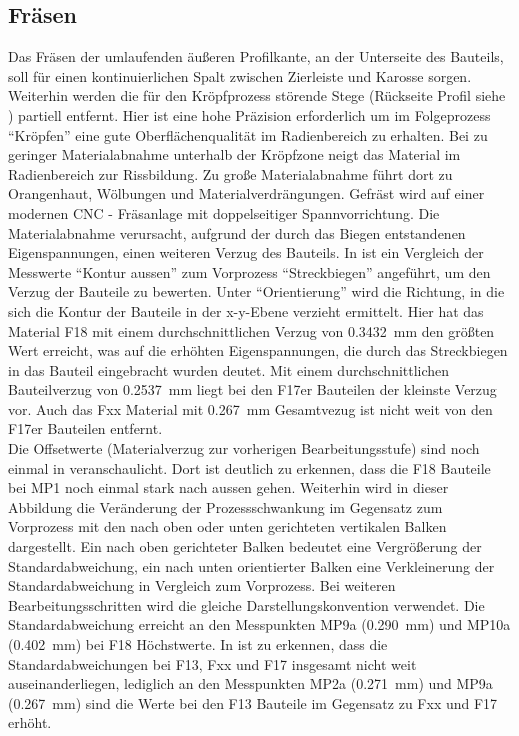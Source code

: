 \documentclass[12pt,a4paper,parskip,twoside,BCOR5mm,headsepline]{scrartcl}
\begin{document}
\subsection{Fräsen}
Das Fräsen der umlaufenden äußeren Profilkante, an der Unterseite des Bauteils, soll für einen kontinuierlichen Spalt zwischen Zierleiste und Karosse  sorgen. Weiterhin werden die für den Kröpfprozess störende Stege (Rückseite Profil siehe ) partiell entfernt.  Hier ist eine hohe Präzision erforderlich um im Folgeprozess "`Kröpfen"' eine gute Oberflächenqualität im Radienbereich zu erhalten. Bei zu geringer Materialabnahme unterhalb der Kröpfzone neigt das Material im Radienbereich zur Rissbildung. Zu große Materialabnahme führt dort zu Orangenhaut, Wölbungen und Materialverdrängungen. Gefräst wird auf einer modernen CNC - Fräsanlage mit doppelseitiger Spannvorrichtung. Die Materialabnahme verursacht,  aufgrund der durch das Biegen entstandenen Eigenspannungen,  einen weiteren Verzug des Bauteils. In   ist ein Vergleich der Messwerte "`Kontur aussen"' zum Vorprozess "`Streckbiegen"' angeführt,  um den Verzug der Bauteile zu bewerten. Unter "`Orientierung"' wird die Richtung,  in die sich die Kontur der Bauteile in der x-y-Ebene verzieht ermittelt. Hier hat das Material F18 mit einem durchschnittlichen Verzug von \SI{0,3432}{\milli\meter} den größten Wert erreicht, was auf die erhöhten Eigenspannungen,  die durch das Streckbiegen in das Bauteil eingebracht wurden deutet. Mit einem durchschnittlichen Bauteilverzug von \SI{0,2537}{\milli\meter} liegt bei den F17er Bauteilen der kleinste  Verzug vor. Auch das Fxx Material mit \SI{0,267}{\milli\meter} Gesamtvezug ist nicht weit von den F17er Bauteilen entfernt.\\
Die Offsetwerte (Materialverzug zur vorherigen Bearbeitungsstufe) sind noch einmal in  veranschaulicht. Dort ist deutlich zu erkennen, dass die F18 Bauteile bei MP1 noch einmal stark nach aussen gehen. Weiterhin wird in dieser Abbildung die Veränderung der Prozessschwankung im Gegensatz zum Vorprozess mit den nach oben oder unten gerichteten vertikalen Balken dargestellt. Ein nach oben gerichteter Balken bedeutet eine Vergrößerung der Standardabweichung, ein nach unten orientierter Balken eine Verkleinerung der Standardabweichung in Vergleich zum Vorprozess. Bei weiteren Bearbeitungsschritten wird die gleiche Darstellungskonvention verwendet.
 Die Standardabweichung erreicht an den Messpunkten MP9a (\SI{0,290}{\milli\meter}) und MP10a (\SI{0,402}{\milli\meter}) bei F18 Höchstwerte. In  ist zu erkennen, dass  die Standardabweichungen bei F13, Fxx und F17 insgesamt nicht weit auseinanderliegen, lediglich an den Messpunkten MP2a (\SI{0,271}{\milli\meter}) und MP9a (\SI{0,267}{\milli\meter}) sind die Werte bei den F13 Bauteile im Gegensatz zu Fxx und F17 erhöht. 
\end{document}

